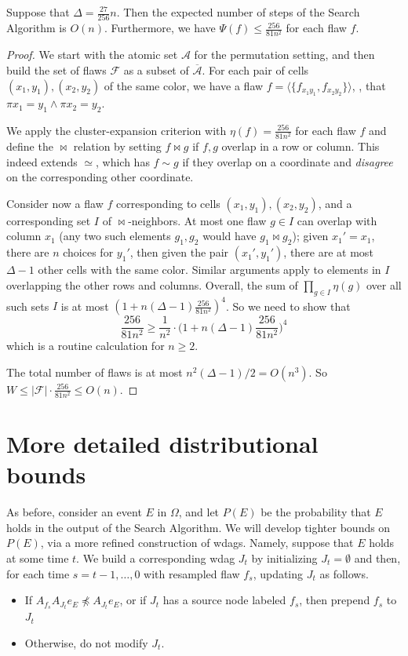 \documentclass{toc}
\newcommand\oa{\overline{\mathcal A}}
\begin{document}
\begin{proposition}
  \label{latin-prop}
  Suppose that $\Delta = \frac{27}{256} n$. Then the expected number of steps of the Search Algorithm is $O(n)$. Furthermore,  we have $\Psi(f) \leq \frac{256}{81 n^2}$ for each flaw $f$.
\end{proposition}
\begin{proof}
 We start with the atomic set $\mathcal A$ for the permutation setting, and then build the set of flaws $\mathcal F$ as a subset of $\oa$. For each pair of cells $(x_1, y_1), (x_2, y_2)$ of the same color, we have a flaw $f = \langle \{ f_{x_1 y_1}, f_{x_2 y_2} \} \rangle$, \ie, that $\pi x_1 = y_1 \wedge \pi x_2 = y_2$.
 
We apply the cluster-expansion criterion with $\eta(f) = \frac{256}{81 n^2}$ for each flaw $f$ and define the $\bowtie$ relation by setting $f \bowtie g$ if $f, g$ overlap in a row or column. This indeed extends $\simeq$, which has $f \sim g$ if they overlap on a coordinate and \emph{disagree} on the corresponding other coordinate.

Consider now a flaw $f$ corresponding to cells $(x_1, y_1), (x_2, y_2)$, and a corresponding set $I$ of $\bowtie$-neighbors. At most one flaw $g \in I$ can overlap with column $x_1$ (any two such elements $g_1, g_2$ would have $g_1 \bowtie g_2$); given $x_1' = x_1$, there are $n$ choices for $y_1'$, then given the pair $(x_1', y_1')$, there are at most $\Delta - 1$ other cells with the same color. Similar arguments apply to elements in $I$ overlapping the other rows and columns. Overall, the sum of $\prod_{g \in I} \eta(g)$ over all such sets $I$ is at most $(1 + n (\Delta-1)  \frac{256}{81 n^2})^4$. So we need to show that
$$
\frac{256}{81 n^2} \geq \frac{1}{n^2} \cdot \bigl( 1 + n (\Delta-1)  \frac{256}{81 n^2} \bigr)^4
$$
which is a routine calculation for $n \geq 2$. 

The total number of flaws is at most $n^2 (\Delta-1) / 2 = O(n^3)$. So $W \leq |\mathcal F| \cdot \frac{256}{81 n^2} \leq O(n)$.
\end{proof}
  
\section{More detailed distributional bounds}
\label{sec:detailedist}
As before, consider an event $E$ in $\Omega$, and let $P(E)$ be the probability that $E$ holds in the output of the Search Algorithm.  We will develop tighter bounds on $P(E)$, via a more refined construction of wdags. Namely, suppose that $E$ holds at some time $t$. We build a corresponding wdag $J_t$ by initializing $J_t = \emptyset$ and then, for each time $s = t-1, \dots, 0$ with resampled flaw $f_s$, updating $J_t$ as follows. %
\begin{itemize}
\item If $A_{f_s} A_{J_t} e_E \not \preceq A_{J_t} e_E$,  or if $J_t$ has a source node labeled $f_s$, then prepend $f_s$ to $J_t$
\item Otherwise, do not modify $J_t$.
\end{itemize}
\end{document}
